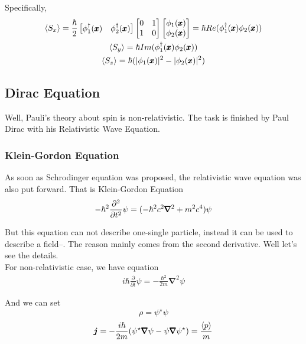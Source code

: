 Specifically, 
\begin{gather}
	\braket{S_x}=\frac{\hbar}{2} \begin{bmatrix}
		\phi^\dagger_1(\pmb{x})& \phi^\dagger_2(\pmb{x})
	\end{bmatrix} \begin{bmatrix}
		0&1\\
		1&0
	\end{bmatrix} \begin{bmatrix}
		\phi_1(\pmb{x})\\ \phi_2(\pmb{x})\end{bmatrix}=\hbar Re(\phi_1^\dagger(\pmb{x})\phi_2(\pmb{x}))\\
		\braket{S_y}=\hbar Im(\phi^\dagger_1(\pmb{x}) \phi_2(\pmb{x}))\\
		\braket{S_z}=\hbar (|\phi_1(\pmb{x})|^2-|\phi_2(\pmb{x})|^2)
\end{gather}

\subsection{Dirac Equation}
\label{sec: dirac equation}

Well, Pauli's theory about spin is non-relativistic. The task is finished by Paul Dirac with his Relativistic Wave Equation. 

\subsubsection{Klein-Gordon Equation}
\label{sec: klein gordon equation}

As soon as  Schrodinger equation was proposed, the relativistic wave equation was also put forward. That is Klein-Gordon Equation
\begin{align*}
	-\hbar^2 \frac{\partial^2}{\partial t^2}\psi=(-\hbar^2c^2 \pmb{\nabla}^2+m^2c^4)\psi
\end{align*}

But this equation can not describe one-single particle, instead it can be used to describe a field--. The reason mainly comes from the second derivative.  Well let's see the details.\\

For non-relativistic case, we have equation
\begin{align*}
	i\hbar \frac{\partial}{\partial t}\psi=-\frac{\hbar^2}{2m}\pmb{\nabla}^2\psi
\end{align*}

And we can set
$$\rho=\psi^\star \psi$$
$$\pmb{j}=-\frac{i\hbar}{2m}(\psi^\star\pmb{\nabla}\psi-\psi \pmb{\nabla}\psi^\star )=\frac{\braket{p}}{m}$$

